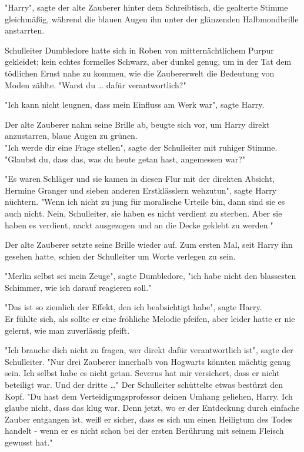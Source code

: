 {"Harry", sagte der alte Zauberer hinter dem Schreibtisch, die gealterte Stimme gleichmäßig, während die blauen Augen ihn unter der glänzenden Halbmondbrille anstarrten.

Schulleiter Dumbledore hatte sich in Roben von mitternächtlichem Purpur gekleidet; kein echtes formelles Schwarz, aber dunkel genug, um in der Tat dem tödlichen Ernst nahe zu kommen, wie die Zaubererwelt die Bedeutung von Moden zählte. "Warst du … dafür verantwortlich?"

"Ich kann nicht leugnen, dass mein Einfluss am Werk war", sagte Harry.

Der alte Zauberer nahm seine Brille ab, beugte sich vor, um Harry direkt anzustarren, blaue Augen zu grünen.\\ "Ich werde dir eine Frage stellen", sagte der Schulleiter mit ruhiger Stimme. "Glaubst du, dass das, was du heute getan hast, angemessen war?"

"Es waren Schläger und sie kamen in diesen Flur mit der direkten Absicht, Hermine Granger und sieben anderen Erstklässlern wehzutun", sagte Harry nüchtern. "Wenn ich nicht zu jung für moralische Urteile bin, dann sind sie es auch nicht. Nein, Schulleiter, sie haben es nicht verdient zu sterben. Aber sie haben es verdient, nackt ausgezogen und an die Decke geklebt zu werden."

Der alte Zauberer setzte seine Brille wieder auf. Zum ersten Mal, seit Harry ihn gesehen hatte, schien der Schulleiter um Worte verlegen zu sein.

"Merlin selbst sei mein Zeuge", sagte Dumbledore, "ich habe nicht den blassesten Schimmer, wie ich darauf reagieren soll."

"Das ist so ziemlich der Effekt, den ich beabsichtigt habe", sagte Harry.\\ Er fühlte sich, als sollte er eine fröhliche Melodie pfeifen, aber leider hatte er nie gelernt, wie man zuverlässig pfeift.

"Ich brauche dich nicht zu fragen, wer direkt dafür verantwortlich ist", sagte der Schulleiter. "Nur drei Zauberer innerhalb von Hogwarts könnten mächtig genug sein. Ich selbst habe es nicht getan. Severus hat mir versichert, dass er nicht beteiligt war. Und der dritte …" Der Schulleiter schüttelte etwas bestürzt den Kopf. "Du hast dem Verteidigungsprofessor deinen Umhang geliehen, Harry. Ich glaube nicht, dass das klug war. Denn jetzt, wo er der Entdeckung durch einfache Zauber entgangen ist, weiß er sicher, dass es sich um einen Heiligtum des Todes handelt - wenn er es nicht schon bei der ersten Berührung mit seinem Fleisch gewusst hat."

}

